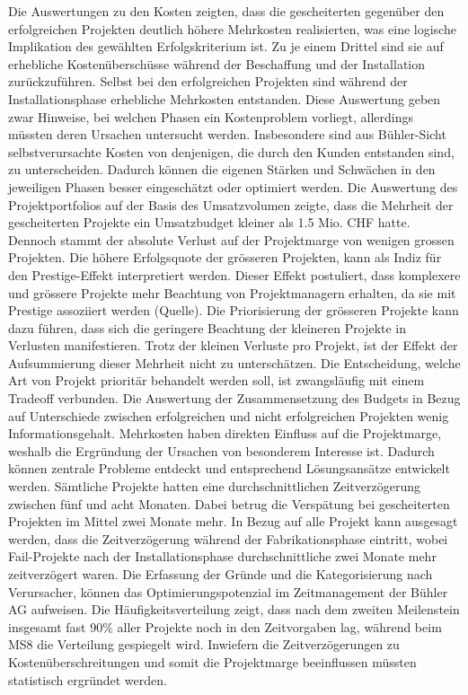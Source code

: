 Die Auswertungen zu den Kosten zeigten, dass die gescheiterten gegenüber den erfolgreichen Projekten deutlich höhere Mehrkosten realisierten, was eine logische Implikation des gewählten Erfolgskriterium ist. Zu je einem Drittel sind sie auf erhebliche Kostenüberschüsse während der Beschaffung und der Installation zurückzuführen. Selbst bei den erfolgreichen Projekten sind während der Installationsphase erhebliche Mehrkosten entstanden. Diese Auswertung geben zwar Hinweise, bei welchen Phasen ein Kostenproblem vorliegt, allerdings müssten deren Ursachen untersucht werden. Insbesondere sind aus Bühler-Sicht selbstverursachte Kosten von denjenigen, die durch den Kunden entstanden sind, zu unterscheiden. Dadurch können die eigenen Stärken und Schwächen in den jeweiligen Phasen besser eingeschätzt oder optimiert werden. Die Auswertung des Projektportfolios auf der Basis des Umsatzvolumen zeigte, dass die Mehrheit der gescheiterten Projekte ein Umsatzbudget kleiner als 1.5 Mio. CHF hatte. Dennoch stammt der absolute Verlust auf der Projektmarge von wenigen grossen Projekten. Die höhere Erfolgsquote der grösseren Projekten, kann als Indiz für den Prestige-Effekt interpretiert werden. Dieser Effekt postuliert, dass komplexere und grössere Projekte mehr Beachtung von Projektmanagern erhalten, da sie mit Prestige assoziiert werden (Quelle). Die Priorisierung der grösseren Projekte kann dazu führen, dass sich die geringere Beachtung der kleineren Projekte in Verlusten manifestieren. Trotz der kleinen Verluste pro Projekt, ist der Effekt der Aufsummierung dieser Mehrheit nicht zu unterschätzen. Die Entscheidung, welche Art von Projekt prioritär behandelt werden soll, ist zwangsläufig mit einem Tradeoff verbunden. Die Auswertung der Zusammensetzung des Budgets in Bezug auf Unterschiede zwischen erfolgreichen und nicht erfolgreichen Projekten wenig Informationsgehalt.
\newline Mehrkosten haben direkten Einfluss auf die Projektmarge, weshalb die Ergründung der Ursachen von besonderem Interesse ist. Dadurch können zentrale Probleme entdeckt und entsprechend Lösungsansätze entwickelt werden. 
\newline\newline
Sämtliche Projekte hatten eine durchschnittlichen Zeitverzögerung zwischen fünf und acht Monaten. Dabei betrug die Verspätung bei gescheiterten Projekten im Mittel zwei Monate mehr. In Bezug auf alle Projekt kann ausgesagt werden, dass die Zeitverzögerung während der Fabrikationsphase eintritt, wobei Fail-Projekte nach der Installationsphase durchschnittliche zwei Monate mehr zeitverzögert waren. Die Erfassung der Gründe und die Kategorisierung nach Verursacher, können das Optimierungspotenzial im Zeitmanagement der Bühler AG aufweisen. Die Häufigkeitsverteilung zeigt, dass nach dem zweiten Meilenstein insgesamt fast 90\% aller Projekte noch in den Zeitvorgaben lag, während beim MS8 die Verteilung gespiegelt wird. Inwiefern die Zeitverzögerungen zu Kostenüberschreitungen und somit die Projektmarge beeinflussen müssten statistisch ergründet werden. 
